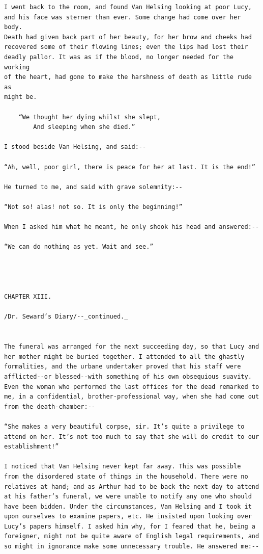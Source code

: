 \documentclass{article}
\begin{document}
\begin{verbatim}
I went back to the room, and found Van Helsing looking at poor Lucy,
and his face was sterner than ever. Some change had come over her body.
Death had given back part of her beauty, for her brow and cheeks had
recovered some of their flowing lines; even the lips had lost their
deadly pallor. It was as if the blood, no longer needed for the working
of the heart, had gone to make the harshness of death as little rude as
might be.

    “We thought her dying whilst she slept,
        And sleeping when she died.”

I stood beside Van Helsing, and said:--

“Ah, well, poor girl, there is peace for her at last. It is the end!”

He turned to me, and said with grave solemnity:--

“Not so! alas! not so. It is only the beginning!”

When I asked him what he meant, he only shook his head and answered:--

“We can do nothing as yet. Wait and see.”




CHAPTER XIII.

/Dr. Seward’s Diary/--_continued._


The funeral was arranged for the next succeeding day, so that Lucy and
her mother might be buried together. I attended to all the ghastly
formalities, and the urbane undertaker proved that his staff were
afflicted--or blessed--with something of his own obsequious suavity.
Even the woman who performed the last offices for the dead remarked to
me, in a confidential, brother-professional way, when she had come out
from the death-chamber:--

“She makes a very beautiful corpse, sir. It’s quite a privilege to
attend on her. It’s not too much to say that she will do credit to our
establishment!”

I noticed that Van Helsing never kept far away. This was possible
from the disordered state of things in the household. There were no
relatives at hand; and as Arthur had to be back the next day to attend
at his father’s funeral, we were unable to notify any one who should
have been bidden. Under the circumstances, Van Helsing and I took it
upon ourselves to examine papers, etc. He insisted upon looking over
Lucy’s papers himself. I asked him why, for I feared that he, being a
foreigner, might not be quite aware of English legal requirements, and
so might in ignorance make some unnecessary trouble. He answered me:--


\end{verbatim}
\end{document}
